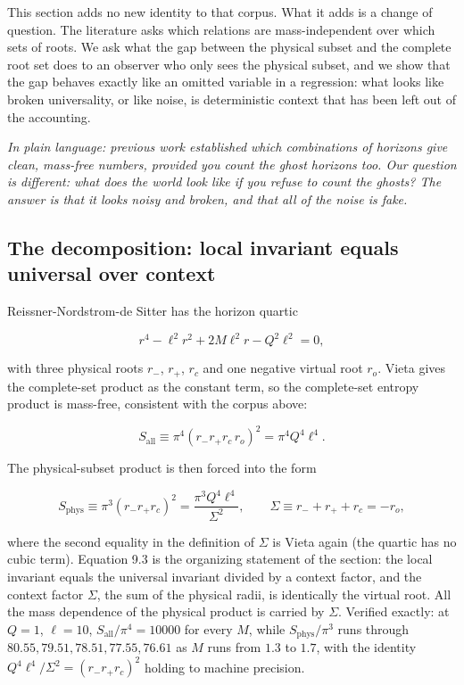 \documentclass[11pt]{article}
\begin{document}
This section adds no new identity to that corpus. What it adds is a change of question. The literature asks which relations are mass-independent over which sets of roots. We ask what the gap between the physical subset and the complete root set does to an observer who only sees the physical subset, and we show that the gap behaves exactly like an omitted variable in a regression: what looks like broken universality, or like noise, is deterministic context that has been left out of the accounting.

\emph{In plain language: previous work established which combinations of horizons give clean, mass-free numbers, provided you count the ghost horizons too. Our question is different: what does the world look like if you refuse to count the ghosts? The answer is that it looks noisy and broken, and that all of the noise is fake.}

\subsection{The decomposition: local invariant equals universal over context}

Reissner-Nordstrom-de Sitter has the horizon quartic


\begin{equation*}
r^4 - \ell^2 r^2 + 2M\ell^2 r - Q^2\ell^2 = 0, \tag{9.1}
\end{equation*}


with three physical roots $r_-$, $r_+$, $r_c$ and one negative virtual root $r_o$. Vieta gives the complete-set product as the constant term, so the complete-set entropy product is mass-free, consistent with the corpus above:


\begin{equation*}
S_{\text{all}} \equiv \pi^4 (r_- r_+ r_c\, r_o)^2 = \pi^4 Q^4 \ell^4. \tag{9.2}
\end{equation*}


The physical-subset product is then forced into the form


\begin{equation*}
S_{\text{phys}} \equiv \pi^3 (r_- r_+ r_c)^2 = \frac{\pi^3 Q^4 \ell^4}{\Sigma^2}, \qquad \Sigma \equiv r_- + r_+ + r_c = -r_o, \tag{9.3}
\end{equation*}


where the second equality in the definition of $\Sigma$ is Vieta again (the quartic has no cubic term). Equation 9.3 is the organizing statement of the section: the local invariant equals the universal invariant divided by a context factor, and the context factor $\Sigma$, the sum of the physical radii, is identically the virtual root. All the mass dependence of the physical product is carried by $\Sigma$. Verified exactly: at $Q = 1$, $\ell = 10$, $S_{\text{all}}/\pi^4 = 10000$ for every $M$, while $S_{\text{phys}}/\pi^3$ runs through $80.55, 79.51, 78.51, 77.55, 76.61$ as $M$ runs from $1.3$ to $1.7$, with the identity $Q^4\ell^4/\Sigma^2 = (r_-r_+r_c)^2$ holding to machine precision.
\end{document}

